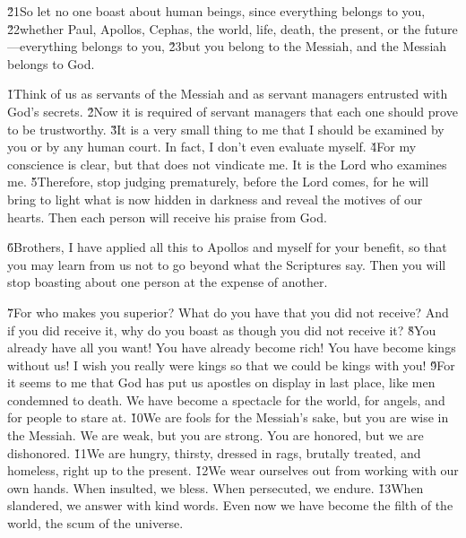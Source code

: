 \v{21}So let no one boast about human beings, since everything belongs to you, \v{22}whether Paul, Apollos, Cephas, the world, life, death, the present, or the future---everything belongs to you, \v{23}but you belong to the Messiah, and the Messiah belongs to God.

\v{1}Think of us as servants of the Messiah and as servant managers entrusted with God's secrets. \v{2}Now it is required of servant managers that each one should prove to be trustworthy. \v{3}It is a very small thing to me that I should be examined by you or by any human court. In fact, I don't even evaluate myself. \v{4}For my conscience is clear, but that does not vindicate me. It is the Lord who examines me. \v{5}Therefore, stop judging prematurely, before the Lord comes, for he will bring to light what is now hidden in darkness and reveal the motives of our hearts. Then each person will receive his praise from God.

\v{6}Brothers, I have applied all this to Apollos and myself for your benefit, so that you may learn from us not to go beyond what the Scriptures say. Then you will stop boasting about one person at the expense of another.

\v{7}For who makes you superior? What do you have that you did not receive? And if you did receive it, why do you boast as though you did not receive it? \v{8}You already have all you want! You have already become rich! You have become kings without us! I wish you really were kings so that we could be kings with you! \v{9}For it seems to me that God has put us apostles on display in last place, like men condemned to death. We have become a spectacle for the world, for angels, and for people to stare at. \v{10}We are fools for the Messiah's sake, but you are wise in the Messiah. We are weak, but you are strong. You are honored, but we are dishonored. \v{11}We are hungry, thirsty, dressed in rags, brutally treated, and homeless, right up to the present. \v{12}We wear ourselves out from working with our own hands. When insulted, we bless. When persecuted, we endure. \v{13}When slandered, we answer with kind words. Even now we have become the filth of the world, the scum of the universe.

